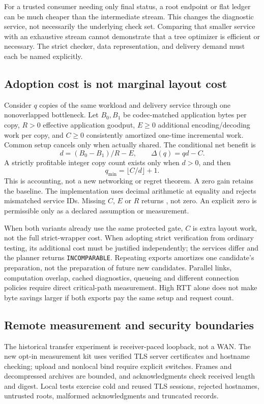 For a trusted consumer needing only final status, a root endpoint or flat ledger
can be much cheaper than the intermediate stream. This changes the diagnostic
service, not necessarily the underlying check set. Comparing that smaller service
with an exhaustive stream cannot demonstrate that a tree optimizer is efficient
or necessary. The strict checker, data representation, and delivery demand must
each be named explicitly.

\subsection{Adoption cost is not marginal layout cost}\label{sec:adoption}
Consider $q$ copies of the same workload and delivery service through one
nonoverlapped bottleneck. Let $B_0,B_1$ be codec-matched application bytes per
copy, $R>0$ effective application goodput, $E\ge 0$ additional
encoding/decoding work per copy, and $C\ge 0$ consistently amortized one-time
incremental work. Common setup cancels only when actually shared. The conditional
net benefit is
\begin{equation}d=(B_0-B_1)/R-E,\qquad \Delta(q)=qd-C.\label{eq:netbenefit}\end{equation}
A strictly profitable integer copy count exists only when $d>0$, and then
\begin{equation}q_{\min}=\lfloor C/d\rfloor+1.\label{eq:qmin}\end{equation}
This is accounting, not a new networking or regret theorem. A zero gain retains
the baseline. The implementation uses decimal arithmetic at equality and rejects
mismatched service IDs. Missing $C$, $E$ or $R$ returns \UNKNOWN{}, not zero. An
explicit zero is permissible only as a declared assumption or measurement.

When both variants already use the same protected gate, $C$ is extra layout work,
not the full strict-wrapper cost. When adopting strict verification from ordinary
testing, its additional cost must be justified independently; the services differ
and the planner returns \texttt{INCOMPARABLE}. Repeating exports amortizes one
candidate's preparation, not the preparation of future new candidates. Parallel
links, computation overlap, cached diagnostics, queueing and different connection
policies require direct critical-path measurement. High RTT alone does not make
byte savings larger if both exports pay the same setup and request count.

\subsection{Remote measurement and security boundaries}\label{sec:remote}
The historical transfer experiment is receiver-paced loopback, not a WAN. The new
opt-in measurement kit uses verified TLS server certificates and hostname
checking; upload and nonlocal bind require explicit switches. Frames and
decompressed archives are bounded, and acknowledgments check received length and
digest. Local tests exercise cold and reused TLS sessions, rejected hostnames,
untrusted roots, malformed acknowledgments and truncated records.

